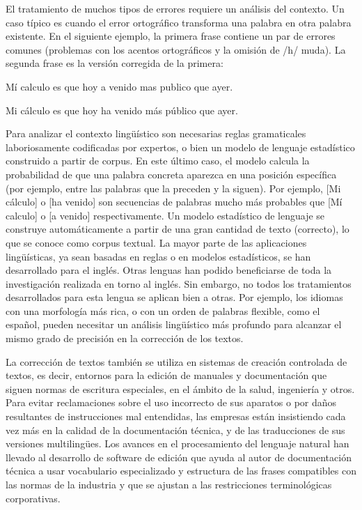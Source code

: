 \begin{multicols}{2}
El tratamiento de muchos tipos de errores requiere un análisis del contexto. Un caso típico es cuando el error ortográfico transforma una palabra en otra palabra existente. En el siguiente ejemplo, la primera frase contiene un par de errores comunes (problemas con los acentos ortográficos y la omisión de /h/ muda). La segunda frase es la versión corregida de la primera:

\medskip
Mí calculo es que hoy a venido mas publico que ayer.

\smallskip
Mi cálculo es que hoy ha venido más público que ayer.

\medskip 
Para analizar el contexto lingüístico son necesarias reglas gramaticales laboriosamente codificadas por expertos, o bien un modelo de lenguaje estadístico construido a partir de corpus. En este último caso, el modelo calcula la probabilidad de que una palabra concreta aparezca en una posición específica (por ejemplo, entre las palabras que la preceden y la siguen). Por ejemplo, [Mi cálculo] o [ha venido] son secuencias de palabras mucho más probables que [Mí calculo] o [a venido] respectivamente. Un modelo estadístico de lenguaje se construye automáticamente a partir de una gran cantidad de texto (correcto), lo que se conoce como corpus textual. La mayor parte de las aplicaciones lingüísticas, ya sean basadas en reglas o en modelos estadísticos, se han desarrollado para el inglés. Otras lenguas han podido beneficiarse de toda la investigación realizada en torno al inglés. Sin embargo, no todos los tratamientos desarrollados para esta lengua se aplican bien a otras. Por ejemplo, los idiomas con una morfología más rica, o con un orden de palabras flexible, como el español, pueden necesitar un análisis lingüístico más profundo para alcanzar el mismo grado de precisión en la corrección de los textos.

La corrección de textos también se utiliza en sistemas de creación controlada de textos, es decir, entornos para la edición de manuales y documentación que siguen normas de escritura especiales, en el ámbito de la salud, ingeniería y otros. Para evitar reclamaciones sobre el uso incorrecto de sus aparatos o por daños resultantes de instrucciones mal entendidas, las empresas están insistiendo cada vez más en la calidad de la documentación técnica, y de las traducciones de sus versiones multilingües. Los avances en el procesamiento del lenguaje natural han llevado al desarrollo de software de edición que ayuda al autor de documentación técnica a usar vocabulario especializado y estructura de las frases compatibles con las normas de la industria y que se ajustan a las restricciones terminológicas corporativas.


\end{multicols}
